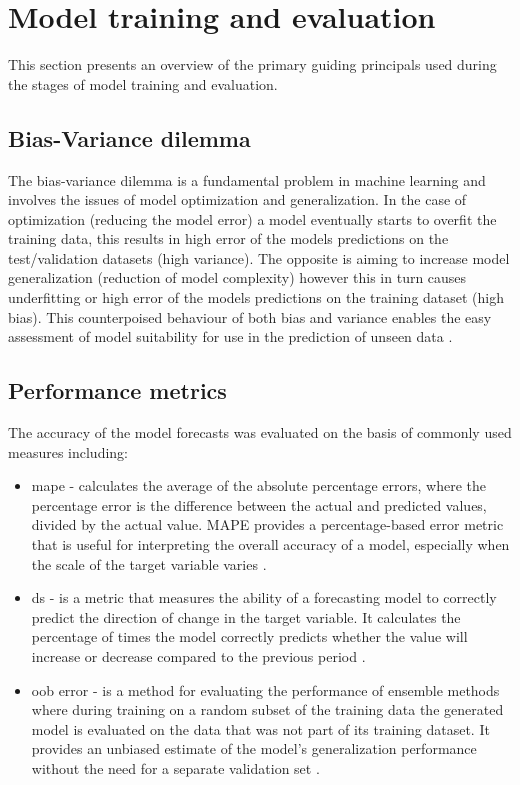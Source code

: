 \section{Model training and evaluation}\label{Model training and evaluation}

This section presents an overview of the primary guiding principals used during the stages of model training and evaluation.

\subsection{Bias-Variance dilemma}\label{Bias-Variance dilemma}

The bias-variance dilemma is a fundamental problem in machine learning and involves the issues of model optimization and generalization. In the case of optimization (reducing the model error) a model eventually starts to overfit the training data, this results in high error of the models predictions on the test/validation datasets (high variance). The opposite is aiming to increase model generalization (reduction of model complexity) however this in turn causes underfitting or high error of the models predictions on the training dataset (high bias). This counterpoised behaviour of both bias and variance enables the easy assessment of model suitability for use in the prediction of unseen data \cite{ibm-ensemble,ibm-regularization,svm-2}. 

\subsection{Performance metrics}\label{Performance metrics}

The accuracy of the model forecasts was evaluated on the basis of commonly used measures including:
\begin{itemize}
    \item \Gls{mape} - calculates the average of the absolute percentage errors, where the percentage error is the difference between the actual and predicted values, divided by the actual value. MAPE provides a percentage-based error metric that is useful for interpreting the overall accuracy of a model, especially when the scale of the target variable varies \cite{scikit-mape}.
    \item \Gls{ds} - is a metric that measures the ability of a forecasting model to correctly predict the direction of change in the target variable. It calculates the percentage of times the model correctly predicts whether the value will increase or decrease compared to the previous period \cite{svm-2}.
    \item \Gls{oob} error - is a method for evaluating the performance of ensemble methods where during training on a random subset of the training data the generated model is evaluated on the data that was not part of its training dataset. It provides an unbiased estimate of the model's generalization performance without the need for a separate validation set \cite{scikit-oob}.
\end{itemize}

